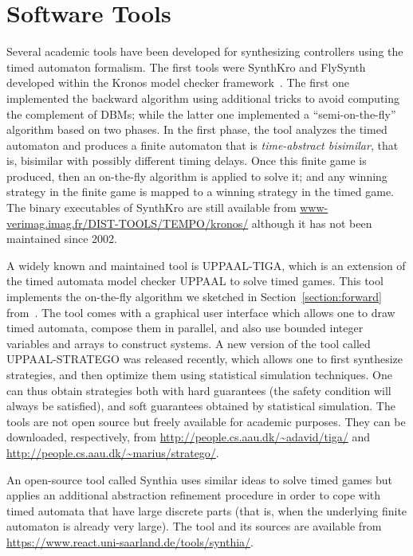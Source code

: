 \documentclass{article}
\begin{document}
\section{Software Tools}
Several academic tools have been developed for synthesizing controllers using the timed
automaton formalism.
The first tools were SynthKro and FlySynth developed within the Kronos model
checker framework~\cite{altisen2002tools}. The first one implemented the
backward algorithm using additional tricks to avoid computing the complement of
DBMs; while the latter one implemented a ``semi-on-the-fly'' algorithm based on
two phases. In the first phase, the tool analyzes the timed automaton and
produces a finite automaton that is \emph{time-abstract bisimilar}, that is,
bisimilar with possibly different timing delays. Once this finite game is
produced, then an on-the-fly algorithm is applied to solve it; and any winning
strategy in the finite game is mapped to a winning strategy in the timed game.
The binary executables of SynthKro are still available from
\url{www-verimag.imag.fr/DIST-TOOLS/TEMPO/kronos/} although it has not been
maintained since 2002.

A widely known and maintained tool is UPPAAL-TIGA, which is an extension of the timed automata
model checker UPPAAL to solve timed games. This tool implements the on-the-fly algorithm
we sketched in Section~\ref{section:forward} from~\cite{Cassez05}. The tool comes with a graphical
user interface which allows one to draw timed automata, compose them in
parallel, and also use bounded integer variables and arrays to construct
systems. A new version of the tool called UPPAAL-STRATEGO was released recently,
which allows one to first synthesize strategies, and then optimize them using
statistical simulation techniques. One can thus obtain strategies both with hard
guarantees (the safety condition will always be satisfied), and soft guarantees
obtained by statistical simulation.
The tools are not open source but freely available for academic purposes. They
can be downloaded, respectively, from
\url{http://people.cs.aau.dk/~adavid/tiga/}
and \url{http://people.cs.aau.dk/~marius/stratego/}.

An open-source tool called Synthia uses similar ideas to solve timed games but applies
an additional abstraction refinement procedure in order to cope with timed
automata that have large discrete parts (that is, when the underlying finite
automaton is already very large). The tool and its sources are available from
\url{https://www.react.uni-saarland.de/tools/synthia/}.
\end{document}
